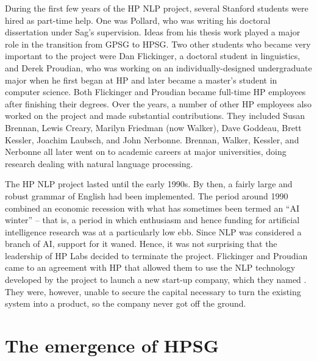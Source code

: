 \documentclass[output=paper
                ,modfonts
                ,nonflat
	        ,collection
	        ,collectionchapter
	        ,collectiontoclongg
 	        ,biblatex
                ,babelshorthands
                ,newtxmath
                ,draftmode
                ,colorlinks, citecolor=brown
]{./langsci/langscibook}
\begin{document}
During the first few years of the HP NLP project, several Stanford students were hired as part-time help.   One was Pollard, who was writing his doctoral dissertation under Sag's supervision.  Ideas from his thesis work played a major role in the transition from GPSG to HPSG.  Two other students who became very important to the project were Dan Flickinger, a doctoral student in linguistics, and Derek Proudian, who was working on an individually-designed undergraduate major when he first began at HP and later became a master's student in computer science.  Both Flickinger and Proudian became full-time HP employees after finishing their degrees.   Over the years, a number of other HP employees also worked on the project and made substantial contributions.  They included Susan Brennan, Lewis Creary, Marilyn Friedman (now Walker), Dave Goddeau, Brett Kessler, Joachim Laubsch, and John Nerbonne.  Brennan, Walker, Kessler, and Nerbonne all later went on to academic careers at major universities, doing research dealing with natural language processing.

The HP NLP project lasted until the early 1990s.  By then, a fairly large and robust grammar of English had been implemented.  The period around 1990 combined an economic recession with what has sometimes been termed an ``AI winter'' -- that is, a period in which enthusiasm and hence funding for artificial intelligence research was at a particularly low ebb.  Since NLP was considered a branch of AI, support for it waned.  Hence, it was not surprising that the leadership of HP Labs decided to terminate the project.  Flickinger and Proudian came to an agreement with HP that allowed them to use the NLP technology developed by the project to launch a new start-up company, which they named .  They were, however, unable to secure the capital necessary to turn the existing system into a product, so the company never got off the ground.

\section{The emergence of HPSG}
\end{document}
